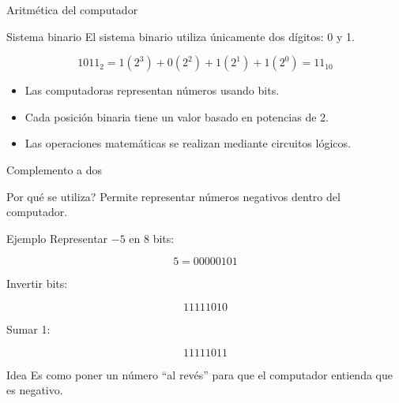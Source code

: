 \documentclass[10pt, aspectratio=169]{beamer}
\begin{document}
	\begin{frame}{Aritmética del computador}
		
		\small
		
		\begin{block}{Sistema binario}
			El sistema binario utiliza únicamente dos dígitos: 0 y 1.
		\end{block}
		
		\[
		1011_2 =
		1(2^3)+0(2^2)+1(2^1)+1(2^0)=11_{10}
		\]
		
		\vspace{0.3cm}
		
		\begin{itemize}
			\item Las computadoras representan números usando bits.
			\item Cada posición binaria tiene un valor basado en potencias de 2.
			\item Las operaciones matemáticas se realizan mediante circuitos lógicos.
		\end{itemize}
		
	\end{frame}
	
	\begin{frame}{Complemento a dos}
		
		\begin{block}{Por qué se utiliza?}
			Permite representar números negativos dentro del computador.
		\end{block}
		
		\vspace{0.005cm}
		
		\begin{block}{Ejemplo}
			Representar $-5$ en 8 bits:
		\end{block}
		
		\[
		5 = 00000101
		\]
		
		Invertir bits:
		
		\[
		11111010
		\]
		
		Sumar 1:
		
		\[
		11111011
		\]
		
		\vspace{0.005cm}
		
		\begin{block}{Idea}
			Es como poner un número ``al revés'' para que el computador entienda que es negativo.
		\end{block}
		
	\end{frame}
	
\end{document}
